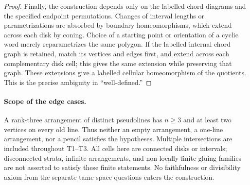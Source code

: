 \documentclass[11pt,a4paper]{article}
\begin{document}
\begin{proof}
Finally, the construction depends only on the labelled chord diagrams
and the specified endpoint permutations. Changes of interval lengths
or parametrizations are absorbed by boundary homeomorphisms, which
extend across each disk by coning. Choice of a starting point or
orientation of a cyclic word merely reparametrizes the same polygon.
If the labelled internal chord graph is retained, match its vertices
and edges first, and extend across each complementary disk cell;
this gives the same extension while preserving that graph. These
extensions give a labelled cellular homeomorphism of the quotients.
This is the precise ambiguity in ``well-defined.''
\end{proof}

\paragraph{Scope of the edge cases.}
A rank-three arrangement of distinct pseudolines has $n\geq3$ and at
least two vertices on every old line. Thus neither an empty arrangement,
a one-line arrangement, nor a pencil satisfies the hypotheses. Multiple
intersections are included throughout T1--T3. All cells here are connected
disks or intervals; disconnected strata, infinite arrangements, and
non-locally-finite gluing families are not asserted to satisfy these
finite statements. No faithfulness or divisibility axiom from the
separate tame-space questions enters the construction.
\end{document}

